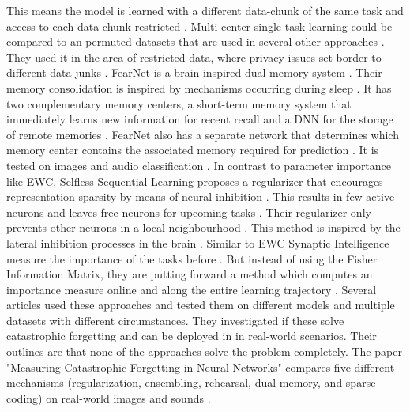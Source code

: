 This means the model is learned with a different data-chunk of the same task and access to each data-chunk restricted \cite{Keep_and_Learn}.
Multi-center single-task learning could be compared to an permuted datasets that are used in several other approaches \cite{Keep_and_Learn}.
They used it in the area of restricted data, where privacy issues set border to different data junks \cite{Keep_and_Learn}.
\newline
FearNet is a brain-inspired dual-memory system \cite{FearNet}.
Their memory consolidation is inspired by mechanisms occurring during sleep \cite{FearNet}.
It has two complementary memory centers, a short-term memory system that immediately learns new information for recent recall and a DNN for the storage of remote memories \cite{FearNet}.
FearNet also has a separate network that determines which memory center contains the associated memory required for prediction \cite{FearNet}.
It is tested on images and audio classification \cite{FearNet}.
\newline
In contrast to parameter importance like EWC, Selfless Sequential Learning proposes a regularizer that encourages representation sparsity by means of neural inhibition \cite{Selfless_Sequential_Learning}.
This results in few active neurons and leaves free neurons for upcoming tasks \cite{Selfless_Sequential_Learning}.
Their regularizer only prevents other neurons in a local neighbourhood \cite{Selfless_Sequential_Learning}.
This method is inspired by the lateral inhibition processes in the brain \cite{Selfless_Sequential_Learning}.
\newline
Similar to EWC Synaptic Intelligence measure the importance of the tasks before \cite{Synaptic_Intelligence}.
But instead of using the Fisher Information Matrix, they are putting forward a method which computes an importance measure online and along the entire learning trajectory \cite{Synaptic_Intelligence}.
\newline
Several articles used these approaches and tested them on different models and multiple datasets with different circumstances.
They investigated if these solve catastrophic forgetting and can be deployed in in real-world scenarios.
Their outlines are that none of the approaches solve the problem completely.
\cite{measuring_cf_in_nns, cf_application_oriented_study}
\newline
The paper "Measuring Catastrophic Forgetting in Neural Networks" compares five different mechanisms (regularization, ensembling, rehearsal, dual-memory, and sparse-coding) on real-world images and sounds \cite{measuring_cf_in_nns}.
